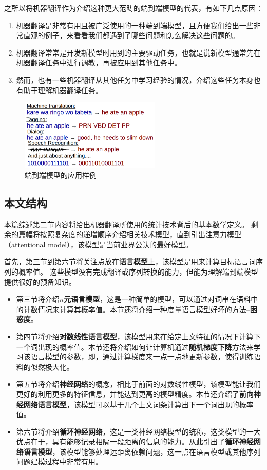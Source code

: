 \documentclass[10pt,a4paper]{ctexart}
\begin{document}
之所以将机器翻译作为介绍这种更大范畴的端到端模型的代表，有如下几点原因：
\begin{enumerate}
\item 机器翻译是非常有用且被广泛使用的一种端到端模型，且方便我们给出一些非常直观的例子，来看看我们都遇到了哪些问题和怎么解决这些问题的。
\item 机器翻译常常是开发新模型时用到的主要驱动任务，也就是说新模型通常先在机器翻译任务中进行调教，再被应用到其他任务中。
\item 然而，也有一些机器翻译从其他任务中学习经验的情况，介绍这些任务本身也有助于理解机器翻译任务。
\end{enumerate}

\begin{figure}[H]
\centering
\includegraphics[width=0.6\textwidth]{fig1.png}
\caption{端到端模型的应用样例}
\label{fig:1}
\end{figure}


\subsection{本文结构}
本篇综述第二节内容将给出机器翻译所使用的统计技术背后的基本数学定义。
剩余的篇幅将按照复杂度的递增顺序介绍相关技术模型，直到引出注意力模型（attentional model），该模型是当前业界公认的最好模型。

首先，第三节到第六节将关注点放在\textbf{语言模型}上，该模型是用来计算目标语言词序列的概率值。
这些模型没有完成翻译或序列转换的能力，但能为理解端到端模型提供很好的预备知识。

\begin{itemize}
\item 第三节将介绍$n$\textbf{元语言模型}，这是一种简单的模型，可以通过对词串在语料中的计数情况来计算其概率值。本节还将介绍一种度量语言模型好坏的方法--\textbf{困惑度}。
\item 第四节将介绍\textbf{对数线性语言模型}，该模型用来在给定上文特征的情况下计算下一个词出现的概率值。本节还将介绍如何让计算机通过\textbf{随机梯度下降}方法来学习该语言模型的参数，即，通过计算梯度来一点一点地更新参数，使得训练语料的似然极大化。
\item 第五节将介绍\textbf{神经网络}的概念，相比于前面的对数线性模型，该模型能让我们更好的利用更多的特征信息，并能达到更高的模型精度。本节还介绍了\textbf{前向神经网络语言模型}，该模型可以基于几个上文词条计算出下一个词出现的概率值。
\item 第六节将介绍\textbf{循环神经网络}，这是一类神经网络模型的统称，这类模型的一大优点在于，具有能够记录相隔一段距离的信息的能力。从此引出了\textbf{循环神经网络语言模型}，该模型能够处理远距离依赖问题，这一点在语言模型或其他序列问题建模过程中非常有用。
\end{itemize}
\end{document}
